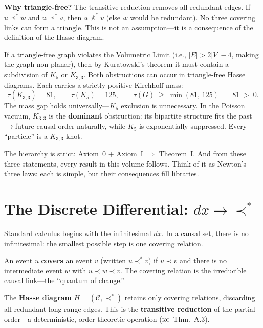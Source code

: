 \documentclass[11pt, a4paper, openany]{book}
\newcommand{\covers}{\prec^*}              %
\newcommand{\KC}[1]{\textnormal{(\textsc{kc}~#1)}}
\newcounter{thm}[chapter]
\begin{document}
\noindent
\textbf{Why triangle-free?} The transitive reduction removes all
redundant edges. If $u \covers w$ and $w \covers v$, then $u \not\covers v$
(else $w$ would be redundant). No three covering links can form a
triangle. This is not an assumption---it is a consequence of the
definition of the Hasse diagram.

\begin{theorem}
\label{thm:kuratowski-resolution}
If a triangle-free graph violates the Volumetric Limit (i.e.,
$|E| > 2|V| - 4$, making the graph non-planar), then by Kuratowski's
theorem it must contain a subdivision of $K_5$ or $K_{3,3}$.
Both obstructions can occur in triangle-free Hasse diagrams.
Each carries a strictly positive Kirchhoff mass:
\begin{equation}
  \tau(K_{3,3}) = 81, \qquad \tau(K_5) = 125, \qquad
  \tau(G) \;\geq\; \min(81,\, 125) \;=\; 81 \;>\; 0.
\end{equation}
The mass gap holds universally---$K_5$ exclusion is unnecessary.
In the Poisson vacuum, $K_{3,3}$ is the \textbf{dominant}
obstruction: its bipartite structure fits the past$\to$future
causal order naturally, while $K_5$ is exponentially suppressed.
Every ``particle'' is a $K_{3,3}$ knot.
\end{theorem}

\medskip\noindent
The hierarchy is strict: Axiom~0 + Axiom~I $\Longrightarrow$ Theorem~I.
And from these three statements, every result in this volume follows.
Think of it as Newton's three laws: each is simple, but their
consequences fill libraries.

\section{The Discrete Differential: $dx \to \covers$}\label{sec:covering}

Standard calculus begins with the infinitesimal $dx$. In a causal set,
there is no infinitesimal: the smallest possible step is one covering
relation.

\begin{definition}[Covering Relation \KC{Def.~1.2}]\label{def:covering}
An event $u$ \textbf{covers} an event $v$ (written $u \covers v$) if
$u \prec v$ and there is no intermediate event $w$ with $u \prec w \prec v$.
The covering relation is the irreducible causal link---the ``quantum of
change.''
\end{definition}

\noindent
The \textbf{Hasse diagram} $H = (\mathcal{C}, \covers)$ retains only
covering relations, discarding all redundant long-range edges. This is
the \textbf{transitive reduction} of the partial order---a deterministic,
order-theoretic operation \KC{Thm.~A.3}.
\end{document}
